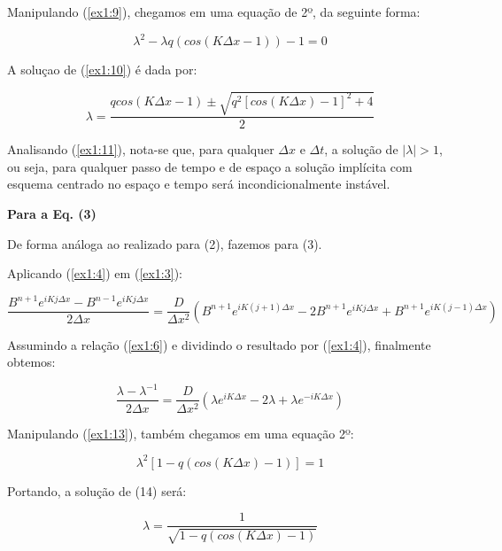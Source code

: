\documentclass[11pt]{article}
\begin{document}
Manipulando (\ref{ex1:9}), chegamos em uma equação de 2º, da seguinte
forma:

\begin{equation}
    \lambda^{2} - \lambda q(cos(K\Delta{x} -1)) -1 = 0
    \label{ex1:10}
\end{equation}

A soluçao de (\ref{ex1:10}) é dada por:

\begin{equation}
    \lambda = \frac{qcos(K\Delta{x} -1) \pm \sqrt{q^2[cos(K\Delta{x})-1]^2 + 4} }{2}
    \label{ex1:11}
\end{equation}

Analisando (\ref{ex1:11}), nota-se que, para qualquer \(\Delta{x}\) e
\(\Delta{t}\), a solução de \(|\lambda| > 1\), ou seja, para qualquer
passo de tempo e de espaço a solução implícita com esquema centrado no
espaço e tempo será incondicionalmente instável.

\textbf{Para a Eq. (3)}

De forma análoga ao realizado para (2), fazemos para (3).

Aplicando (\ref{ex1:4}) em (\ref{ex1:3}):

\begin{equation}
        \frac{B^{n+1}e^{iKj\Delta{x}} - B^{n-1}e^{iKj\Delta{x}} }{2\Delta{x}} = \frac{D}{\Delta{x^2}}(B^{n+1}e^{iK(j+1)\Delta{x}} - 2B^{n+1}e^{iKj\Delta{x}} + B^{n+1}e^{iK(j-1)\Delta{x}})
        \label{ex1:12}
\end{equation}

Assumindo a relação (\ref{ex1:6}) e dividindo o resultado por
(\ref{ex1:4}), finalmente obtemos:

\begin{equation}
    \frac{\lambda - \lambda^{-1}}{2\Delta{x}} = \frac{D}{\Delta{x^2}}(\lambda e^{iK\Delta{x}} - 2\lambda + \lambda e^{-iK\Delta{x}})
    \label{ex1:13}
\end{equation}

Manipulando (\ref{ex1:13}), também chegamos em uma equação 2º:

\begin{equation}
    \lambda^{2}[1 - q(cos(K\Delta{x}) - 1)] = 1
    \label{ex1:14}
\end{equation}

Portando, a solução de (14) será:

\begin{equation}
    \lambda = \frac{1}{\sqrt{1 - q(cos(K\Delta{x}) - 1)}}
    \label{ex1:15}
\end{equation}
\end{document}
